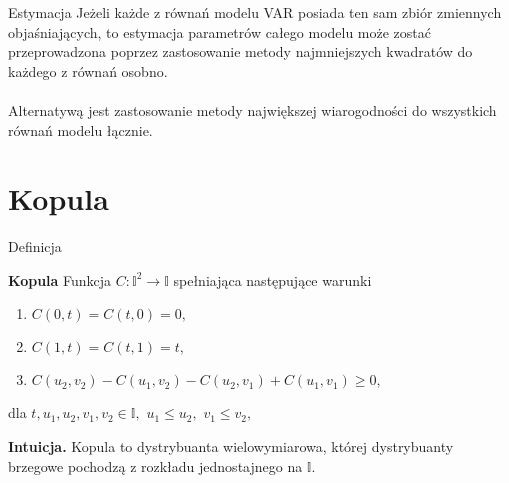 \documentclass[a4paper, 11pt]{beamer}
\begin{document}
	\begin{frame}{Estymacja}
		Jeżeli każde z równań modelu VAR posiada ten sam zbiór zmiennych
		objaśniających, to estymacja parametrów całego modelu może zostać
		przeprowadzona poprzez zastosowanie metody najmniejszych kwadratów
		do każdego z równań osobno.
		\\~\\
		Alternatywą jest zastosowanie metody największej wiarogodności do
		wszystkich równań modelu łącznie.
	\end{frame}
	
	\section{Kopula}
	
	\begin{frame}{Definicja}
		\begin{block}{\textbf{Kopula}}
			Funkcja $C:\mathbb{I}^{2}\rightarrow\mathbb{I}$ spełniająca następujące warunki
			\begin{enumerate}
				\item $C\left(0,t\right) = C\left(t,0\right) = 0,$
        \item $C\left(1,t\right) = C\left(t,1\right) = t,$
				\item $C\left(u_2, v_2\right) - C\left(u_1, v_2\right) - C\left(u_2, v_1\right) + C\left(u_1 ,v_1\right) \geq 0,$
			\end{enumerate}
			dla $t, u_1, u_2, v_1, v_2 \in \mathbb{I},$ $u_1 \leq u_2,$ $v_1 \leq v_2,$
		\end{block}
    
		\begin{alert}{\textbf{Intuicja.}}
			Kopula to dystrybuanta wielowymiarowa, której dystrybuanty brzegowe pochodzą z rozkładu jednostajnego na $\mathbb{I}$.
		\end{alert}
	\end{frame}
	
\end{document}
